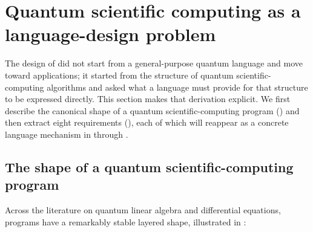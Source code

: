 \section{Quantum scientific computing as a language-design problem}
\label{sec:requirements}

The design of \pqlang{} did not start from a general-purpose quantum language
and move toward applications; it started from the structure of quantum
scientific-computing algorithms and asked what a language must provide for
that structure to be expressed directly.  This section makes that derivation
explicit.  We first describe the canonical shape of a quantum
scientific-computing program () and then extract
eight requirements (), each of which will
reappear as a concrete language mechanism in  through
.

\subsection{The shape of a quantum scientific-computing program}
\label{sec:qsc-structure}

Across the literature on quantum linear algebra and differential equations,
programs have a remarkably stable layered shape, illustrated in
:


